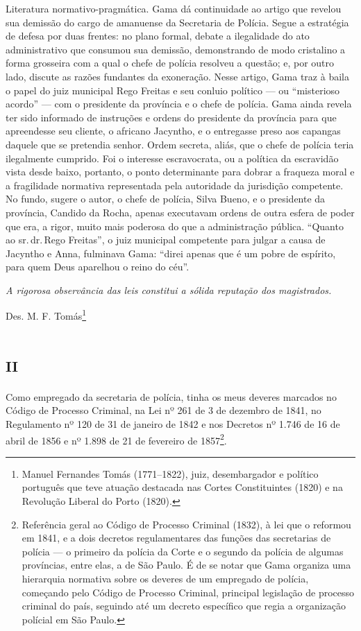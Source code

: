 \begin{didascalia}
Literatura normativo-pragmática. Gama dá continuidade ao artigo que
revelou sua demissão do cargo de amanuense da Secretaria de Polícia.
Segue a estratégia de defesa por duas frentes: no plano formal, debate a
ilegalidade do ato administrativo que consumou sua demissão,
demonstrando de modo cristalino a forma grosseira com a qual o chefe de
polícia resolveu a questão; e, por outro lado, discute as razões
fundantes da exoneração. Nesse artigo, Gama traz à baila o papel do juiz
municipal Rego Freitas e seu conluio político --- ou ``misterioso acordo''
--- com o presidente da província e o chefe de polícia. Gama ainda revela
ter sido informado de instruções e ordens do presidente da província
para que apreendesse seu cliente, o africano Jacyntho, e o entregasse
preso aos capangas daquele que se pretendia senhor. Ordem secreta,
aliás, que o chefe de polícia teria ilegalmente cumprido. Foi o
interesse escravocrata, ou a política da escravidão vista desde baixo,
portanto, o ponto determinante para dobrar a fraqueza moral e a
fragilidade normativa representada pela autoridade da jurisdição
competente. No fundo, sugere o autor, o chefe de polícia, Silva Bueno, e
o presidente da província, Candido da Rocha, apenas executavam ordens de
outra esfera de poder que era, a rigor, muito mais poderosa do que a
administração pública. ``Quanto ao sr.\,dr.\,Rego Freitas'', o juiz
municipal competente para julgar a causa de Jacyntho e Anna, fulminava
Gama: ``direi apenas que é um pobre de espírito, para quem Deus aparelhou
o reino do céu''.
\end{didascalia}



\emph{A rigorosa observância das leis constitui a sólida reputação dos
magistrados.}

Des. M. F. Tomás\footnote{Manuel Fernandes Tomás (1771--1822), juiz,
  desembargador e político português que teve atuação destacada nas
  Cortes Constituintes (1820) e na Revolução Liberal do Porto (1820).}

\section{\textsc{ii}}

Como empregado da secretaria de polícia, tinha os meus deveres marcados
no Código de Processo Criminal, na Lei nº 261 de 3 de dezembro de 1841,
no Regulamento nº 120 de 31 de janeiro de 1842 e nos Decretos nº 1.746
de 16 de abril de 1856 e nº 1.898 de 21 de fevereiro de 1857\footnote{
  Referência geral ao Código de Processo Criminal (1832), à lei que o
  reformou em 1841, e a dois decretos regulamentares das funções das
  secretarias de polícia --- o primeiro da polícia da Corte e o segundo
  da polícia de algumas províncias, entre elas, a de São Paulo. É de se
  notar que Gama organiza uma hierarquia normativa sobre os deveres de
  um empregado de polícia, começando pelo Código de Processo Criminal,
  principal legislação de processo criminal do país, seguindo até um
  decreto específico que regia a organização polícial em São Paulo.}.

